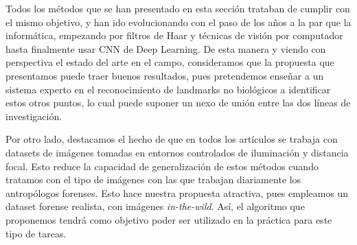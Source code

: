                 \noindent Todos los métodos que se han presentado en esta sección trataban de cumplir con el mismo objetivo, y han ido evolucionando con el paso de los años a la par que la informática, empezando por filtros de Haar y técnicas de visión por computador hasta finalmente usar CNN de Deep Learning. De esta manera y viendo con perspectiva el estado del arte en el campo, consideramos que la propuesta que presentamos puede traer buenos resultados, pues pretendemos enseñar a un sistema experto en el reconocimiento de landmarks no biológicos a identificar estos otros puntos, lo cual puede suponer un nexo de unión entre las dos líneas de investigación.

                \medskip

                \noindent Por otro lado, destacamos el hecho de que en todos los artículos se trabaja con datasets de imágenes tomadas en entornos controlados de iluminación y distancia focal. Esto reduce la capacidad de generalización de estos métodos cuando tratamos con el tipo de imágenes con las que trabajan diariamente los antropólogos forenses. Esto hace nuestra propuesta atractiva, pues empleamos un dataset forense realista, con imágenes \textit{in-the-wild}. Así, el algoritmo que proponemos tendrá como objetivo poder ser utilizado en la práctica para este tipo de tareas.
   
\endinput

